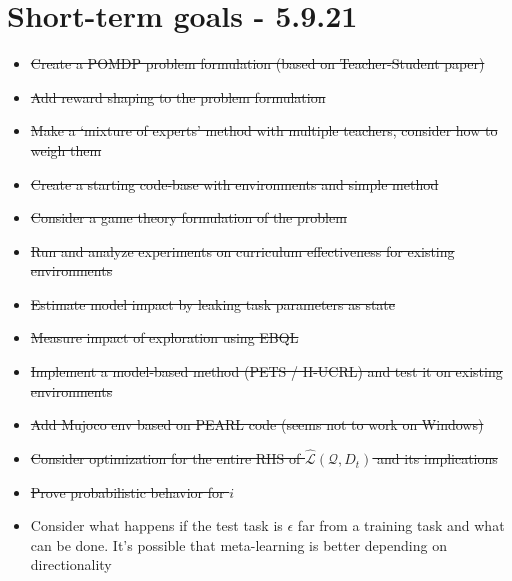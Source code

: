 \documentclass[letterpaper]{article}
\theoremstyle{definition}
\begin{document}
\section{Short-term goals - 5.9.21} \label{sec:short-term}

\begin{itemize}
	\item \sout{Create a POMDP problem formulation (based on Teacher-Student paper) }
	\item \sout{Add reward shaping to the problem formulation}
	\item \sout{Make a `mixture of experts' method with multiple teachers, consider how to weigh them}
	\item \sout{Create a starting code-base with environments and simple method}
	\item \sout{Consider a game theory formulation of the problem}
	\item \sout{Run and analyze experiments on curriculum effectiveness for existing environments}
	\item \sout{Estimate model impact by leaking task parameters as state}
	\item \sout{Measure impact of exploration using EBQL}
	\item \sout{Implement a model-based method (PETS / H-UCRL) and test it on existing environments}
	\item \sout{Add Mujoco env based on PEARL code (seems not to work on Windows)}
	\item \sout{Consider optimization for the entire RHS of $\hat{\mathcal{L}}(\mathcal{Q}, D_t)$ and its implications}
	\item \sout{Prove probabilistic behavior for $i$}
	\item Consider what happens if the test task is $\epsilon$ far from a training task and what can be done. It's possible that meta-learning is better depending on directionality
\end{itemize}
\end{document}
